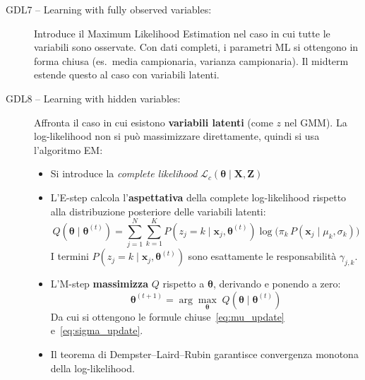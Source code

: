 \documentclass[11pt,a4paper]{article}
\begin{document}
\begin{description}
    \item[GDL7 -- Learning with fully observed variables:] Introduce il Maximum Likelihood Estimation nel caso in cui tutte le variabili sono osservate. Con dati completi, i parametri ML si ottengono in forma chiusa (es.\ media campionaria, varianza campionaria). Il midterm estende questo al caso con variabili latenti.

    \item[GDL8 -- Learning with hidden variables:] Affronta il caso in cui esistono \textbf{variabili latenti} (come $z$ nel GMM). La log-likelihood non si pu\`o massimizzare direttamente, quindi si usa l'algoritmo EM:
    \begin{itemize}
        \item Si introduce la \emph{complete likelihood} $\mathcal{L}_c(\boldsymbol{\theta}\mid\mathbf{X}, \mathbf{Z})$
        \item L'E-step calcola l'\textbf{aspettativa} della complete log-likelihood rispetto alla distribuzione posteriore delle variabili latenti:
        \begin{equation*}
            Q(\boldsymbol{\theta}\mid\boldsymbol{\theta}^{(t)}) = \sum_{j=1}^N\sum_{k=1}^K P(z_j = k \mid \mathbf{x}_j, \boldsymbol{\theta}^{(t)}) \log\!\bigl(\pi_k\, P(\mathbf{x}_j\mid \mu_k, \sigma_k)\bigr)
        \end{equation*}
        I termini $P(z_j = k \mid \mathbf{x}_j, \boldsymbol{\theta}^{(t)})$ sono esattamente le responsabilit\`a $\gamma_{j,k}$.
        \item L'M-step \textbf{massimizza} $Q$ rispetto a $\boldsymbol{\theta}$, derivando e ponendo a zero:
        \begin{equation*}
            \boldsymbol{\theta}^{(t+1)} = \arg\max_{\boldsymbol{\theta}}\; Q(\boldsymbol{\theta}\mid\boldsymbol{\theta}^{(t)})
        \end{equation*}
        Da cui si ottengono le formule chiuse~\eqref{eq:mu_update} e~\eqref{eq:sigma_update}.
        \item Il teorema di Dempster--Laird--Rubin garantisce convergenza monotona della log-likelihood.
    \end{itemize}
\end{description}
\end{document}
